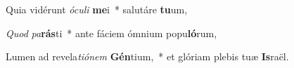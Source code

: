 \item Quia vidérunt \textit{ó}\textit{cu}\textit{li} \textbf{me}i~* salutáre \textbf{tu}um,
\item \textit{Quod} \textit{pa}\textbf{rás}ti~* ante fáciem ómnium popu\textbf{ló}rum,
\item Lumen ad revela\textit{ti}\textit{ó}\textit{nem} \textbf{Gén}tium,~* et glóriam plebis tuæ \textbf{Is}raël.
